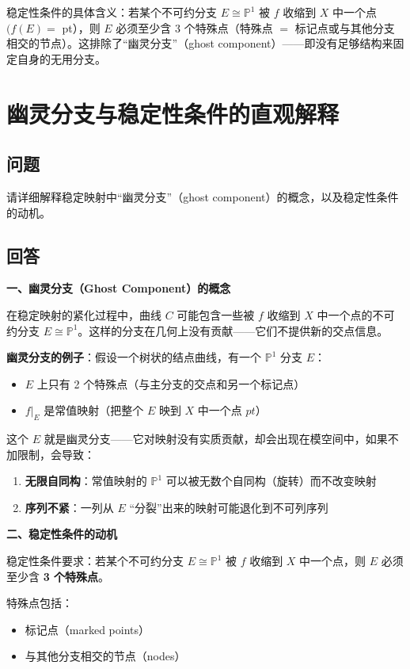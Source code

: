 稳定性条件的具体含义：若某个不可约分支 $E \cong \mathbb{P}^1$ 被 $f$ 收缩到 $X$ 中一个点 $(f(E)=$ pt），则 $E$ 必须至少含 3 个特殊点（特殊点 $=$ 标记点或与其他分支相交的节点）。这排除了``幽灵分支''（ghost component）——即没有足够结构来固定自身的无用分支。

\section{幽灵分支与稳定性条件的直观解释}\label{sec:qa-ghost-component-stability}
\subsection{问题}
请详细解释稳定映射中``幽灵分支''（ghost component）的概念，以及稳定性条件的动机。
\subsection{回答}
\textbf{一、幽灵分支（Ghost Component）的概念}

在稳定映射的紧化过程中，曲线 $C$ 可能包含一些被 $f$ 收缩到 $X$ 中一个点的不可约分支 $E \cong \mathbb{P}^1$。这样的分支在几何上没有贡献——它们不提供新的交点信息。

\textbf{幽灵分支的例子}：假设一个树状的结点曲线，有一个 $\mathbb{P}^1$ 分支 $E$：
\begin{itemize}
\item $E$ 上只有 2 个特殊点（与主分支的交点和另一个标记点）
\item $f|_E$ 是常值映射（把整个 $E$ 映到 $X$ 中一个点 $pt$）
\end{itemize}

这个 $E$ 就是幽灵分支——它对映射没有实质贡献，却会出现在模空间中，如果不加限制，会导致：
\begin{enumerate}
\item \textbf{无限自同构}：常值映射的 $\mathbb{P}^1$ 可以被无数个自同构（旋转）而不改变映射
\item \textbf{序列不紧}：一列从 $E$ ``分裂''出来的映射可能退化到不可列序列
\end{enumerate}

\textbf{二、稳定性条件的动机}

稳定性条件要求：若某个不可约分支 $E \cong \mathbb{P}^1$ 被 $f$ 收缩到 $X$ 中一个点，则 $E$ 必须至少含 \textbf{3 个特殊点}。

特殊点包括：
\begin{itemize}
\item 标记点（marked points）
\item 与其他分支相交的节点（nodes）
\end{itemize}

